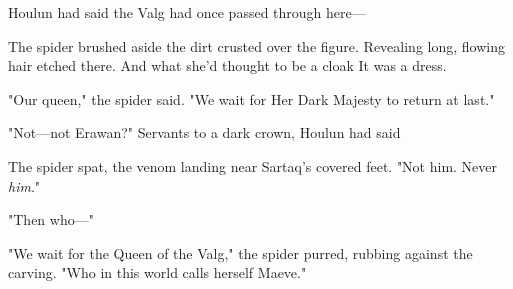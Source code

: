 Houlun had said the Valg had once passed through here---

The spider brushed aside the dirt crusted over the figure.
Revealing long, flowing hair etched there.
And what she'd thought to be a cloak  It was a dress.

"Our queen," the spider said.
"We wait for Her Dark Majesty to return at last."

"Not---not Erawan?"
Servants to a dark crown, Houlun had said 

The spider spat, the venom landing near Sartaq's covered feet.
"Not him.
Never \emph{him}."

"Then who---"

"We wait for the Queen of the Valg," the spider purred, rubbing against the carving.
"Who in this world calls herself Maeve."

